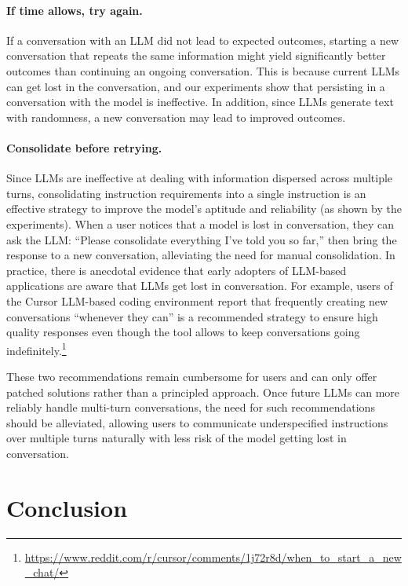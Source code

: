 \documentclass{article}
\begin{document}
\paragraph{If time allows, try again.} If a conversation with an LLM did not lead to expected outcomes, starting a new conversation that repeats the same information might yield significantly better outcomes than continuing an ongoing conversation. This is because current LLMs can get lost in the conversation, and our experiments show that persisting in a conversation with the model is ineffective. In addition, since LLMs generate text with randomness, a new conversation may lead to improved outcomes.

\paragraph{Consolidate before retrying.} Since LLMs are ineffective at dealing with information dispersed across multiple turns, consolidating instruction requirements into a single instruction is an effective strategy to improve the model's aptitude and reliability (as shown by the \concatt experiments).
When a user notices that a model is lost in conversation, they can ask the LLM: ``Please consolidate everything I've told you so far,'' then bring the response to a new conversation, alleviating the need for manual consolidation. In practice, there is anecdotal evidence that early adopters of LLM-based applications are aware that LLMs get lost in conversation. For example, users of the Cursor LLM-based coding environment report that frequently creating new conversations ``whenever they can'' is a recommended strategy to ensure high quality responses even though the tool allows to keep conversations going indefinitely.\footnote{\url{https://www.reddit.com/r/cursor/comments/1j72r8d/when_to_start_a_new_chat/}} %

These two recommendations remain cumbersome for users and can only offer patched solutions rather than a principled approach. Once future LLMs can more reliably handle multi-turn conversations, the need for such recommendations should be alleviated, allowing users to communicate underspecified instructions over multiple turns naturally with less risk of the model getting lost in conversation.

\section{Conclusion}\label{sec:conclusion}
\end{document}
